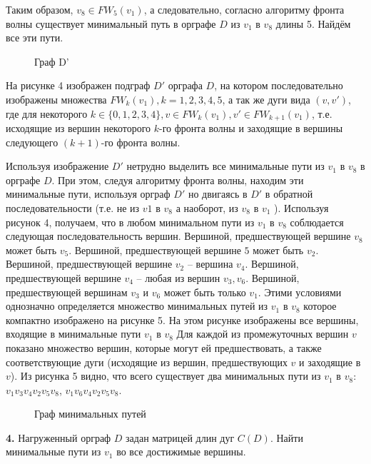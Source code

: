\documentclass[12pt, letterpaper, titlepage]{article}
\begin{document}
Таким образом, $v_8 \in FW_5(v_1)$, а следовательно, согласно алгоритму фронта волны существует минимальный
путь в орграфе $D$ из $v_1$ в $v_8$ длины 5. Найдём все эти пути.
\begin{figure}[H]\centering\caption{Граф D'}\end{figure}
На рисунке 4 изображен подграф $D'$ орграфа $D$, на котором последовательно изображены множества
$FW_k(v_1), k=1,2,3,4,5$, а так же  дуги вида $(v, v')$, где для некоторого $k \in \{0,1,2,3,4\},
    v \in FW_k(v_1), v' \in FW_{k+1}(v_1)$, т.е. исходящие из вершин некоторого $k$-го фронта волны и
заходящие в вершины следующего $(k+1)$-го фронта волны.

Используя изображение $D'$ нетрудно выделить все минимальные пути из $v_1$ в $v_8$
в орграфе $D$. При этом, следуя алгоритму фронта волны, находим эти минимальные пути, используя орграф $D'$
но двигаясь в $D'$ в обратной последовательности (т.е. не из $v1$ в $v_8$ а наоборот, из $v_8$
в $v_1$ ). Используя рисунок 4, получаем, что в любом минимальном пути из $v_1$ в $v_8$
соблюдается следующая последовательность вершин. Вершиной, предшествующей
вершине $v_8$ может быть $v_5$. Вершиной, предшествующей вершине $5$
может быть $v_2$. Вершиной, предшествующей вершине $v_2$ – вершина $v_4$.
Вершиной, предшествующей вершине $v_4$ – любая из вершин $v_3,v_6$.
Вершиной, предшествующей вершинам $v_3$ и $v_6$ может быть только $v_1$. Этими условиями однозначно определяется множество
минимальных путей из $v_1$ в $v_8$ которое компактно изображено на рисунке 5. На этом
рисунке изображены все вершины, входящие в минимальные пути $v_1$ в $v_8$ Для каждой
из промежуточных вершин $v$ показано множество вершин, которые могут ей
предшествовать, а также соответствующие дуги (исходящие из вершин, предшествующих $v$
и заходящие в $v$). Из рисунка 5 видно, что всего существует два минимальных пути из $v_1$ в
$v_8$: $v_1v_3v_4v_2v_5v_8$, $v_1v_6v_4v_2v_5v_8$.
\begin{figure}[H]\centering\caption{Граф минимальных путей}\end{figure}
\newpage
\textbf{4.} Нагруженный орграф $D$ задан матрицей длин дуг $C(D)$. Найти минимальные пути из $v_1$ во все достижимые вершины.
\end{document}
